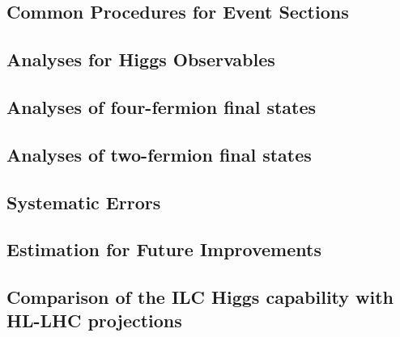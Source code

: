 




\subsection{Common Procedures for Event Sections}



\subsection{Analyses for Higgs Observables}


\subsection{Analyses of four-fermion final states} 


\subsection{Analyses of two-fermion final states}


\subsection{Systematic Errors}



\subsection{Estimation for Future Improvements}



\subsection{Comparison of the ILC Higgs capability with 
HL-LHC projections}



